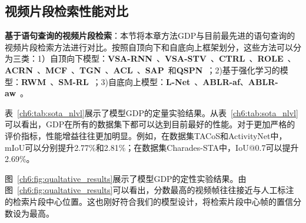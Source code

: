 \begin{table}[tbp]
    \centering
    \caption{不同基于视频查询的视频片段检索方法的性能对比}
    \label{ch6:tab:sota_vrl}
\end{table}


\subsection{视频片段检索性能对比}

\textbf{基于语句查询的视频片段检索}：本节将本章方法GDP与目前最先进的语句查询的视频片段检索方法进行对比。按照自顶向下和自底向上框架划分，这些方法可以分为三类：1）自顶向下模型：\textbf{VSA-RNN}~\cite{gao2017tall}、\textbf{VSA-STV}~\cite{gao2017tall}、\textbf{CTRL}~\cite{gao2017tall}、\textbf{ROLE}~\cite{liu2018cross}、\textbf{ACRN}~\cite{liu2018attentive}、\textbf{MCF}~\cite{wu2018multi}、\textbf{TGN}~\cite{chen2018temporally}、\textbf{ACL}~\cite{ge2019mac}、\textbf{SAP}~\cite{chen2019semantic}和\textbf{QSPN}~\cite{xu2019multilevel}；2)基于强化学习的模型：\textbf{RWM}~\cite{he2019read}、\textbf{SM-RL}~\cite{wang2019language}；3)自底向上模型：\textbf{L-Net}~\cite{chen2019localizing}、\textbf{ABLR-af}、\textbf{ABLR-aw}~\cite{yuan2019find}。

表~\ref{ch6:tab:sota_nlvl}展示了模型GDP的定量实验结果。从表~\ref{ch6:tab:sota_nlvl}可以看出，GDP在所有的数据集下都可以达到目前最好的性能。对于更加严格的评价指标，性能增益往往更加明显。例如，在数据集TACoS和ActivityNet中，mIoU可以分别提升2.77\%和2.81\%；在数据集Charades-STA中，IoU@0.7可以提升2.69\%。

图~\ref{ch6:fig:qualtative_results}展示了模型GDP的定性实验结果。由图~\ref{ch6:fig:qualtative_results}可以看出，分数最高的视频帧往往接近与人工标注的检索片段中心位置。这也刚好符合我们的模型设计，将检索片段中心帧的置信分数设为最高。



